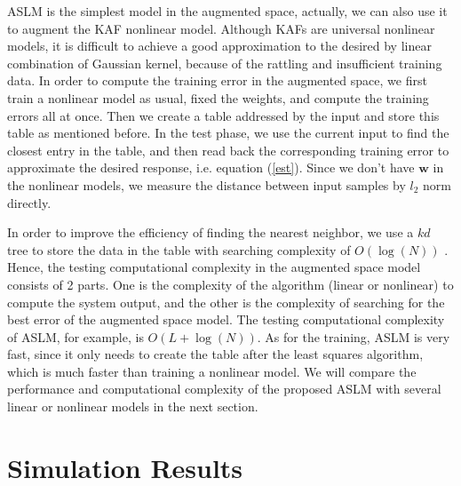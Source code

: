 \documentclass{article}
\begin{document}
ASLM is the simplest model in the augmented space, actually, we can also use it to augment the KAF nonlinear model. Although KAFs are universal nonlinear models, it is difficult to achieve a good approximation to the desired by linear combination of Gaussian kernel, because of the rattling and insufficient training data. In order to compute the training error in the augmented space, we first train a nonlinear model as usual, fixed the weights, and compute the training errors all at once. Then we create a table addressed by the input and store this table as mentioned before. In the test phase, we use the current input to find the closest entry in the table, and then read back the corresponding training error to approximate the desired response, i.e. equation (\ref{est}). Since we don't have $ \textbf{w} $ in the nonlinear models, we measure the distance between input samples by $ l_{2} $ norm directly.

In order to improve the efficiency of finding the nearest neighbor, we use a $ kd $ tree to store the data in the table with searching complexity of $ O(\log(N)) $ \cite{samet1990design}. Hence, the testing computational complexity in the augmented space model consists of 2 parts. One is the complexity of the algorithm (linear or nonlinear) to compute the system output, and the other is the complexity of searching for the best error of the augmented space model. The testing computational complexity of ASLM, for example, is $ O(L+\log(N)) $. As for the training, ASLM is very fast, since it only needs to create the table after the least squares algorithm, which is much faster than training a nonlinear model. We will compare the performance and computational complexity of the proposed ASLM with several linear or nonlinear models in the next section.
\vspace{-3mm}
\section{Simulation Results}
\end{document}
